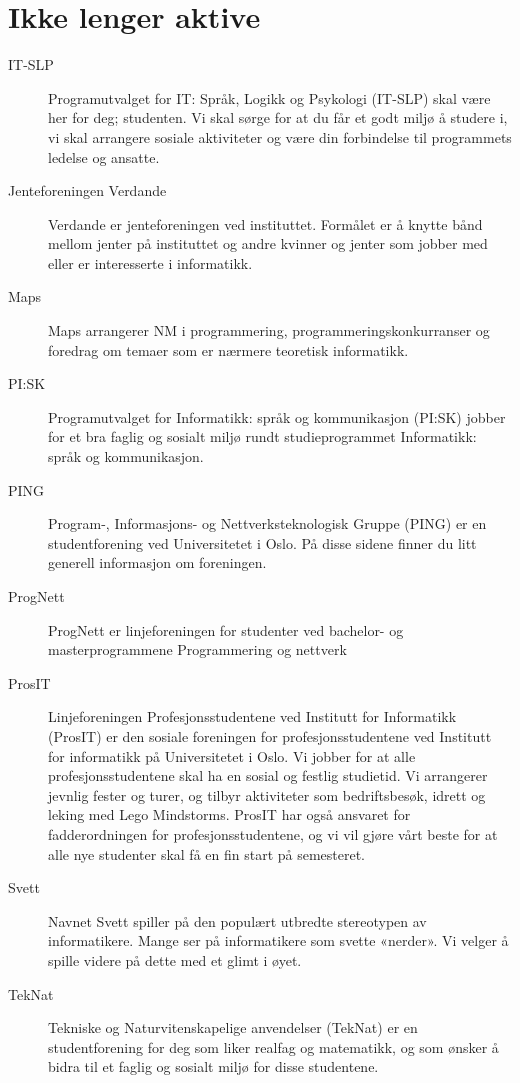 \section{Ikke lenger aktive}

\begin{description}
	\item[IT-SLP] Programutvalget for IT: Språk, Logikk og Psykologi (IT-SLP) skal være her for deg; studenten. Vi skal sørge for at du får et godt miljø å studere i, vi skal arrangere sosiale aktiviteter og være din forbindelse til programmets ledelse og ansatte.
	\item[Jenteforeningen Verdande] Verdande er jenteforeningen ved instituttet. Formålet er å knytte bånd mellom jenter på instituttet og andre kvinner og jenter som jobber med eller er interesserte i informatikk.
	\item[Maps] Maps arrangerer NM i programmering, programmeringskonkurranser og foredrag om temaer som er nærmere teoretisk informatikk.
	\item[PI:SK] Programutvalget for Informatikk: språk og kommunikasjon (PI:SK) jobber for et bra faglig og sosialt miljø rundt studieprogrammet Informatikk: språk og kommunikasjon.
	\item[PING] Program-, Informasjons- og Nettverksteknologisk Gruppe (PING) er en studentforening ved Universitetet i Oslo. På disse sidene finner du litt generell informasjon om foreningen.
	\item[ProgNett] ProgNett er linjeforeningen for studenter ved bachelor- og masterprogrammene Programmering og nettverk
	\item[ProsIT] Linjeforeningen Profesjonsstudentene ved Institutt for Informatikk (ProsIT) er den sosiale foreningen for profesjonsstudentene ved Institutt for informatikk på Universitetet i Oslo. Vi jobber for at alle profesjonsstudentene skal ha en sosial og festlig studietid. Vi arrangerer jevnlig fester og turer, og tilbyr aktiviteter som bedriftsbesøk, idrett og leking med Lego Mindstorms. ProsIT har også ansvaret for fadderordningen for profesjonsstudentene, og vi vil gjøre vårt beste for at alle nye studenter skal få en fin start på semesteret.
	\item[Svett] Navnet Svett spiller på den populært utbredte stereotypen av informatikere. Mange ser på informatikere som svette «nerder». Vi velger å spille videre på dette med et glimt i øyet.
	\item[TekNat] Tekniske og Naturvitenskapelige anvendelser (TekNat) er en studentforening for deg som liker realfag og matematikk, og som ønsker å bidra til et faglig og sosialt miljø for disse studentene.
\end{description}
